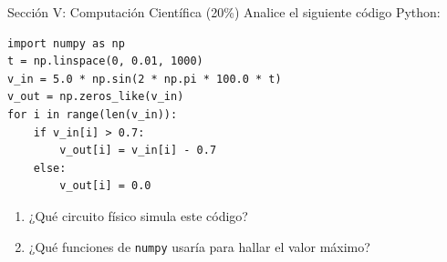\documentclass[aspectratio=169]{beamer}
\begin{document}
\begin{frame}[fragile]{Sección V: Computación Científica (20\%)}
    Analice el siguiente código Python:
\begin{verbatim}
import numpy as np
t = np.linspace(0, 0.01, 1000)
v_in = 5.0 * np.sin(2 * np.pi * 100.0 * t)
v_out = np.zeros_like(v_in)
for i in range(len(v_in)):
    if v_in[i] > 0.7:
        v_out[i] = v_in[i] - 0.7
    else:
        v_out[i] = 0.0
\end{verbatim}
    \begin{enumerate}
        \item ¿Qué circuito físico simula este código?
        \item ¿Qué funciones de \texttt{numpy} usaría para hallar el valor máximo?
    \end{enumerate}
\end{frame}
\end{document}
